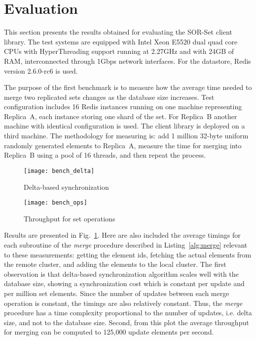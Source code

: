 \section{Evaluation}
\label{sec:evaluation}

This section presents the results obtained for evaluating the SOR-Set client
library. The test systems are equipped with Intel Xeon E5520 dual quad core
CPUs with HyperThreading support running at 2.27GHz and with 24GB of RAM,
interconnected through 1Gbps network interfaces. For the datastore, Redis
version 2.6.0-rc6 is used.

The purpose of the first benchmark is to measure how the average time needed to
merge two replicated sets changes as the database size increases. Test
configuration includes 16 Redis instances running on one machine representing
Replica~A, each instance storing one shard of the set. For Replica~B another
machine with identical configuration is used. The client library is deployed
on a third machine. The methodology for measuring is: add 1 million 32-byte
uniform randomly generated elements to Replica~A, measure the time for merging
into Replica~B using a pool of 16 threads, and then repeat the process.

\begin{figure}[t]
  \centering
  \begin{minipage}{1\linewidth}
    \centering
    \texttt{[image: bench\_delta]}
    \caption{Delta-based synchronization}
    \label{fig:bench_delta}
  \end{minipage}
\end{figure}

\begin{figure}[t]
  \centering
  \begin{minipage}{1\linewidth}
    \centering
    \texttt{[image: bench\_ops]}
    \caption{Throughput for set operations}
    \label{fig:bench_ops}
  \end{minipage}
\end{figure}

Results are presented in Fig.~\ref{fig:bench_delta}. Here are also included
the average timings for each subroutine  of the \textit{merge} procedure
described in Listing~\ref{alg:merge} relevant to these measurements:
getting the element ids, fetching the actual elements from the remote
cluster, and adding the elements to the local cluster. The first observation is
that delta-based synchronization algorithm scales well with the database size, showing a synchronization cost which is constant per update and per million set elements.
Since the number of updates between each merge operation is constant, the
timings are also relatively constant. Thus, the \textit{merge} procedure has a
time complexity proportional to the number of updates, i.e. delta size, and not
to the database size. Second, from this plot the average throughput for merging
can be computed to 125,000 update elements per second.

